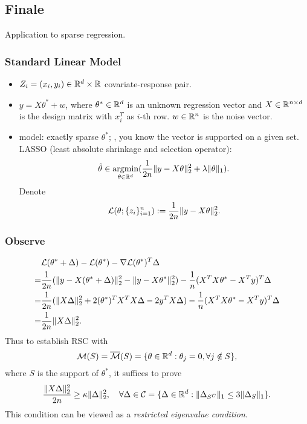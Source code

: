 \subsection{Finale}

Application to sparse regression.

\subsubsection{Standard Linear Model}

\begin{itemize}
    \item $Z_i=(x_i,y_i)\in{\mathbb{R}}^d\times{\mathbb{R}}$ covariate-response pair.
    \item $y=X\theta^*+w$,
        where $\theta^*\in{\mathbb{R}}^d$ is an unknown regression vector and
        $X\in{\mathbb{R}}^{n\times d}$ is the design matrix with $x_i^T$ as $i$-th row.
        $w\in{\mathbb{R}}^n$ is the noise vector.
    \item model: exactly sparse $\theta^*$;
        \ie, you know the vector is supported on a given set.
        LASSO (least absolute shrinkage and selection operator):
        \begin{equation}
            {\hat{\theta}}\in\mathop{\mathrm{argmin}}_{\theta\in{\mathbb{R}}^d}(\frac{1}{2n}\|y-X\theta\|_2^2+\lambda\|\theta\|_1).
        \end{equation}
        Denote
        \begin{equation}
            \mathcal{L}(\theta;\{z_i\}_{i=1}^n) := \frac{1}{2n}\|y-X\theta\|_2^2.
        \end{equation}
\end{itemize}

\subsubsection{Observe}

\begin{equation}
\begin{split}
      & \mathcal{L}(\theta^*+\Delta)-\mathcal{L}(\theta^*)-\nabla\mathcal{L}(\theta^*)^T\Delta    \\
    = & \frac{1}{2n}(\|y-X(\theta^*+\Delta)\|_2^2-\|y-X\theta^*\|_2^2)
        - \frac{1}{n}(X^TX\theta^*-X^Ty)^T\Delta  \\
    = & \frac{1}{2n}(\|X\Delta\|_2^2+2(\theta^*)^TX^TX\Delta-2y^TX\Delta)
        - \frac{1}{n}(X^TX\theta^*-X^Ty)^T\Delta  \\
    = & \frac{1}{2n}\|X\Delta\|_2^2.
\end{split}
\end{equation}
Thus to establish RSC with
\begin{equation}
    \mathcal{M}(S) = {\overline{\mathcal{M}}}(S) = \{\theta\in{\mathbb{R}}^d:\theta_j=0, \forall j\notin S\},
\end{equation}
where $S$ is the support of $\theta^*$,
it suffices to prove
\begin{equation}
    \frac{\|X\Delta\|_2^2}{2n}\ge \kappa\|\Delta\|_2^2,\quad
        \forall \Delta\in\mathcal{C}=\{\Delta\in{\mathbb{R}}^d:\|\Delta_{S^C}\|_1\le3\|\Delta_S\|_1\}.
\end{equation}
This condition can be viewed as a \emph{restricted eigenvalue condition}.

